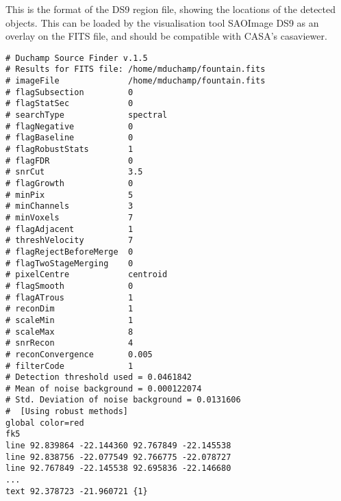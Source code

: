 %
%
%
%
\label{app-ds9}

This is the format of the DS9 region file, showing the locations
of the detected objects. This can be loaded by the visualisation tool
SAOImage DS9 as an overlay on the FITS file, and should be compatible
with CASA's casaviewer.

\begin{verbatim}
# Duchamp Source Finder v.1.5
# Results for FITS file: /home/mduchamp/fountain.fits
# imageFile              /home/mduchamp/fountain.fits
# flagSubsection         0
# flagStatSec            0
# searchType             spectral
# flagNegative           0
# flagBaseline           0
# flagRobustStats        1
# flagFDR                0
# snrCut                 3.5
# flagGrowth             0
# minPix                 5
# minChannels            3
# minVoxels              7
# flagAdjacent           1
# threshVelocity         7
# flagRejectBeforeMerge  0
# flagTwoStageMerging    0
# pixelCentre            centroid
# flagSmooth             0
# flagATrous             1
# reconDim               1
# scaleMin               1
# scaleMax               8
# snrRecon               4
# reconConvergence       0.005
# filterCode             1
# Detection threshold used = 0.0461842
# Mean of noise background = 0.000122074
# Std. Deviation of noise background = 0.0131606
#  [Using robust methods]
global color=red
fk5
line 92.839864 -22.144360 92.767849 -22.145538
line 92.838756 -22.077549 92.766775 -22.078727
line 92.767849 -22.145538 92.695836 -22.146680
...
text 92.378723 -21.960721 {1}
\end{verbatim}

